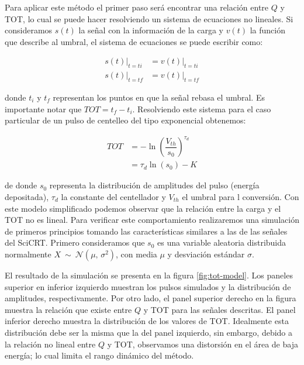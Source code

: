 Para aplicar este método el primer paso será encontrar una relación entre $Q$ y TOT, lo cual se puede hacer resolviendo un sistema de ecuaciones no lineales. Si consideramos $s\left(t\right)$ la señal con la información de la carga y $v\left(t\right)$ la función que describe al umbral, el sistema de ecuaciones se puede escribir como:

\begin{equation}
\label{equ:tot-equ}
\begin{aligned}
\left. s\left(t\right)\right|_{t=ti} &= \left. v\left(t\right)\right|_{t=ti}\\
\left. s\left(t\right)\right|_{t=tf} &= \left. v\left(t\right)\right|_{t=tf}
\end{aligned}
\end{equation}

donde $t_{i}$ y $t_{f}$ representan los puntos en que la señal rebasa el umbral. Es importante notar que $TOT=t_{f}-t_{i}$. Resolviendo este sistema para el caso particular de un pulso de centelleo del tipo exponencial obtenemos:

\begin{equation}
\begin{aligned}
TOT &= -\ln\left(\dfrac{V_{th}}{s_{0}}\right)^{\tau_{d}}\\
 &= \tau_{d} \ln\left(s_{0}\right)-K
\end{aligned}
\end{equation}

de donde $s_{0}$ representa la distribución de amplitudes del pulso (energía depositada), $\tau_{d}$ la constante del centellador y $V_{th}$ el umbral para l conversión. Con este modelo simplificado podemos observar que la relación entre la carga y el TOT no es lineal. Para verificar este comportamiento realizaremos una simulación de primeros principios tomando las características similares a las de las señales del SciCRT. Primero consideramos que $s_{0}$ es una variable aleatoria distribuida normalmente $X\ \sim\ \mathcal{N}\left(\mu,\,\sigma^2\right)$, con media $\mu$ y desviación estándar $\sigma$.

El resultado de la simulación se presenta en la figura \ref{fig:tot-model}. Los paneles superior en inferior izquierdo muestran los pulsos simulados y la distribución de amplitudes, respectivamente. Por otro lado, el panel superior derecho en la figura muestra la relación que existe entre $Q$ y TOT para las señales descritas. El panel inferior derecho muestra la distribución de los valores de TOT. Idealmente esta distribución debe ser la misma que la del panel izquierdo, sin embargo, debido a la relación no lineal entre $Q$ y TOT, observamos una distorsión en el área de baja energía; lo cual limita el rango dinámico del método.

